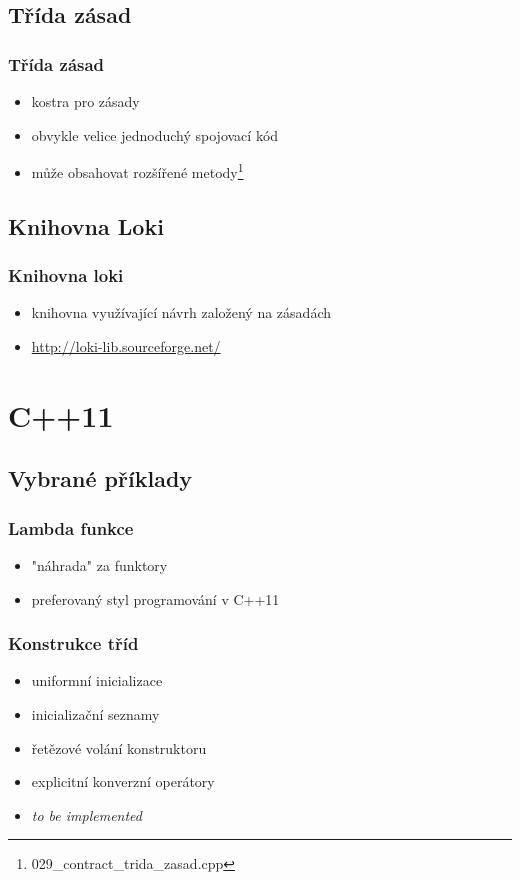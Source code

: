 \subsection{Třída zásad}

\begin{frame}
	\frametitle{Třída zásad}
	\begin{itemize}
		\item{kostra pro zásady}
		\item{obvykle velice jednoduchý spojovací kód}
		\item{může obsahovat rozšířené metody\footnote{029\_contract\_trida\_zasad.cpp}}
	\end{itemize}
\end{frame}

\subsection{Knihovna Loki}

\begin{frame} \frametitle{Knihovna loki}
	\begin{itemize}
		\item{knihovna využívající návrh založený na zásadách}
		\item{\url{http://loki-lib.sourceforge.net/}}
	\end{itemize}
\end{frame}

\section{C++11}
\subsection{Vybrané příklady}


\begin{frame} \frametitle{Lambda funkce}
	\begin{itemize}
		\item{"náhrada" za funktory}
		\item{preferovaný styl programování v C++11}
	\end{itemize}
\end{frame}

\begin{frame} \frametitle{Konstrukce tříd}
	\begin{itemize}
		\item{uniformní inicializace}
		\item{inicializační seznamy}
		\item{řetězové volání konstruktoru}
		\item{explicitní konverzní operátory}
		\item{\textit{to be implemented}}
	\end{itemize}
\end{frame}

